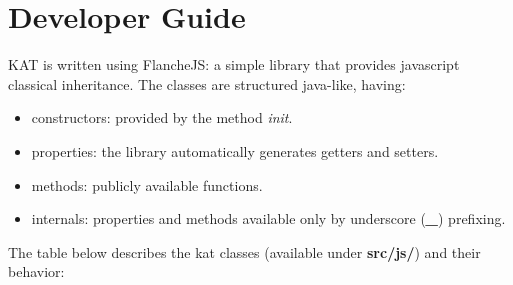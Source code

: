 \documentclass[a4paper, 12pt, notitlepage]{report}
\begin{document}
\section{Developer Guide}
KAT is written using FlancheJS: a simple library that provides javascript classical inheritance. The classes are structured java-like, having:
\begin{itemize}
 \item constructors: provided by the method \textit{\textit{init}}.
 \item properties: the library automatically generates getters and setters.
 \item methods: publicly available functions.
 \item internals: properties and methods available only by underscore (\textbf{\textit{\_}}) prefixing.
\end{itemize}

The table below describes the kat classes (available under \textbf{src/js/}) and their behavior:
\end{document}
